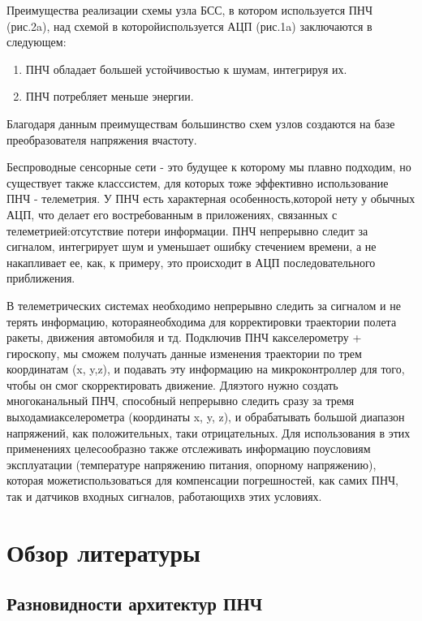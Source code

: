 \documentclass[a4paper,12pt,oneside]{scrartcl}
\begin{document}
Преимущества реализации схемы узла БСС, в котором используется ПНЧ (рис.2a), над схемой в которойиспользуется АЦП (рис.1a) заключаются в следующем:
\begin{enumerate}
    \item ПНЧ обладает большей устойчивостью к шумам, интегрируя их.
    \item ПНЧ потребляет меньше энергии.
\end{enumerate}
Благодаря данным преимуществам большинство схем узлов создаются на базе преобразователя напряжения вчастоту.

Беспроводные сенсорные сети - это будущее к которому мы плавно подходим, но существует также класссистем, для которых тоже эффективно использование ПНЧ - телеметрия. У ПНЧ есть характерная особенность,которой нету у обычных АЦП, что делает его востребованным в приложениях, связанных с телеметрией:отсутствие потери информации. ПНЧ непрерывно следит за сигналом, интегрирует шум и уменьшает ошибку стечением времени, а не накапливает ее, как, к примеру, это происходит в АЦП последовательного приближения. 

В телеметрических системах необходимо непрерывно следить за сигналом и не терять информацию, котораянеобходима для корректировки траектории полета ракеты, движения автомобиля и тд. Подключив ПНЧ какселерометру + гироскопу, мы сможем получать данные изменения траектории по трем координатам (x, y,z), и подавать эту информацию на микроконтроллер для того, чтобы он смог скорректировать движение. Дляэтого нужно создать многоканальный ПНЧ, способный непрерывно следить сразу за тремя выходамиакселерометра (координаты x, y, z), и обрабатывать большой диапазон напряжений, как положительных, таки отрицательных. Для использования в этих применениях целесообразно также отслеживать информацию поусловиям эксплуатации (температуре напряжению питания, опорному напряжению), которая можетиспользоваться для компенсации погрешностей, как самих ПНЧ, так и датчиков входных сигналов, работающихв этих условиях.~\cite{B2}
\clearpage












\section{Обзор литературы}




\subsection{Разновидности архитектур ПНЧ}
\end{document}
